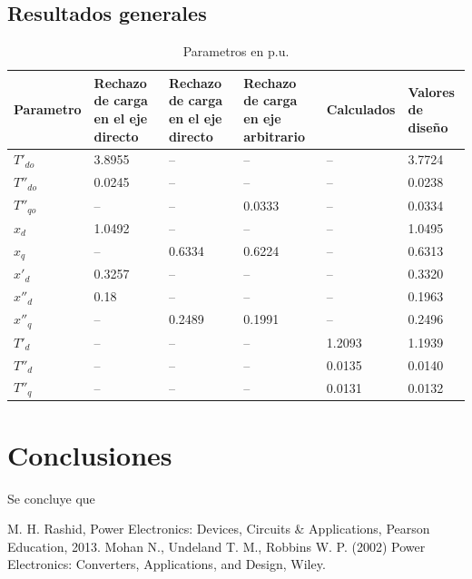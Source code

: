 \documentclass[conference]{IEEEtran}
\begin{document}
\subsection{Resultados generales}


\setlength{\extrarowheight}{2pt} %
\begin{table}[ht]
\centering
\caption{Parametros en p.u.}
\setlength{\tabcolsep}{6pt}
\begin{tabular}{C{1cm} C{1cm} C{1cm} C{1cm} C{1cm} C{1.25cm}}
\toprule
\textbf{Parametro} &
\textbf{Rechazo de carga en el eje directo} &
\textbf{Rechazo de carga en el eje directo} &
\textbf{Rechazo de carga en eje arbitrario} &
\textbf{Calculados} & 
\textbf{Valores de diseño} \\
\hline
\midrule
$T'_{do}$ & 3.8955 & --     & --     & --     & 3.7724 \\
$T''_{do}$ & 0.0245 & --     & --     & --     & 0.0238 \\
$T''_{qo}$ & --     & --     & 0.0333 & --     & 0.0334 \\
$x_d$ & 1.0492 & --     & --     & --     & 1.0495 \\
$x_q$ & --     & 0.6334 & 0.6224 & --     & 0.6313 \\
$x'_d$ & 0.3257 & --     & --     & --     & 0.3320 \\
$x''_d$ & 0.18 & --     & --     & --     & 0.1963 \\
$x''_q$ & --     & 0.2489 & 0.1991 & --     & 0.2496 \\
$T'_d$ & --     & --     & --     & 1.2093 & 1.1939 \\
$T''_d$ & --     & --     & --     & 0.0135 & 0.0140 \\
$T''_q$ & --     & --     & --     & 0.0131 & 0.0132 \\
\bottomrule
\end{tabular}
\end{table}


\section{Conclusiones}
Se concluye que 

\begin{thebibliography}{plain}
 M. H. Rashid, Power Electronics: Devices, Circuits \& Applications, Pearson Education, 2013.
 Mohan N., Undeland T. M., Robbins W. P. (2002) Power Electronics: Converters, Applications, and Design, Wiley.
\end{thebibliography}
\end{document}
